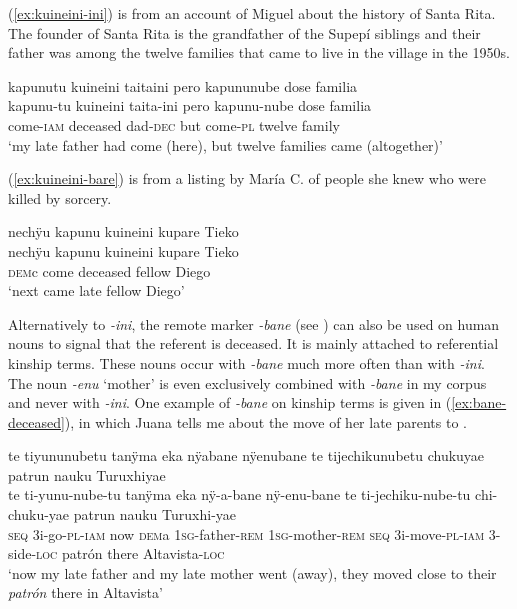 (\ref{ex:kuineini-ini}) is from an account of Miguel about the history of Santa Rita. The founder of Santa Rita is the grandfather of the Supepí siblings and their father was among the twelve families that came to live in the village in the 1950s.

\ea\label{ex:kuineini-ini}
\begingl 
\glpreamble kapunutu kuineini taitaini pero kapununube dose familia\\
\gla kapunu-tu kuineini taita-ini pero kapunu-nube dose familia\\ 
\glb come-\textsc{iam} deceased dad-\textsc{dec} but come-\textsc{pl} twelve family\\ 
\glft ‘my late father had come (here), but twelve families came (altogether)’\\ 
\endgl
\trailingcitation{[mxx-p110825l.056]}
\xe

(\ref{ex:kuineini-bare}) is from a listing by María C. of people she knew who were killed by sorcery.

\ea\label{ex:kuineini-bare}
\begingl 
\glpreamble nechÿu kapunu kuineini kupare Tieko\\
\gla nechÿu kapunu kuineini kupare Tieko\\ 
\glb \textsc{dem}c come deceased fellow Diego\\ 
\glft ‘next came late fellow Diego’\\ 
\endgl
\trailingcitation{[ump-p110815sf.640]}
\xe

Alternatively to \textit{-ini}, the remote marker \textit{-bane} (see ) can also be used on human nouns to signal that the referent is deceased. It is mainly attached to referential kinship terms. These nouns occur with \textit{-bane} much more often than with \textit{-ini}. The noun \textit{-enu} ‘mother’ is even exclusively combined with \textit{-bane} in my corpus and never with \textit{-ini}. One example of \textit{-bane} on kinship terms is given in (\ref{ex:bane-deceased}), in which Juana tells me about the move of her late parents to .

\ea\label{ex:bane-deceased}
\begingl 
\glpreamble te tiyununubetu tanÿma eka nÿabane nÿenubane te tijechikunubetu chukuyae patrun nauku Turuxhiyae\\
\gla te ti-yunu-nube-tu tanÿma eka nÿ-a-bane nÿ-enu-bane te ti-jechiku-nube-tu chi-chuku-yae patrun nauku Turuxhi-yae\\ 
\glb \textsc{seq} 3i-go-\textsc{pl}-\textsc{iam} now \textsc{dem}a 1\textsc{sg}-father-\textsc{rem} 1\textsc{sg}-mother-\textsc{rem} \textsc{seq} 3i-move-\textsc{pl}-\textsc{iam} 3-side-\textsc{loc} patrón there Altavista-\textsc{loc}\\ 
\glft ‘now my late father and my late mother went (away), they moved close to their \textit{patrón} there in Altavista’ \\ 
\endgl
\trailingcitation{[jxx-e150925l-1.248]}
\xe


